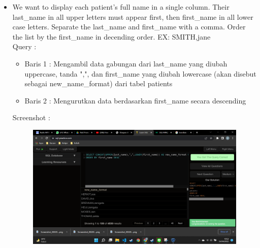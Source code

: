 \documentclass[]{article}
\begin{document}
\begin{itemize}
        \item We want to display each patient's full name in a single column. Their last\_name in all upper letters must appear first, then first\_name in all lower case letters. Separate the last\_name and first\_name with a comma. Order the list by the first\_name in decending order. EX: SMITH,jane
        \\Query :
        
        \begin{itemize}
            \item Baris 1 : Mengambil data gabungan dari last\_name yang diubah uppercase, tanda ",", dan first\_name yang diubah lowercase (akan disebut sebagai new\_name\_format) dari tabel patients
            \item Baris 2 : Mengurutkan data berdasarkan first\_name secara descending
        \end{itemize}
        \pagebreak
        Screenshot :
        \begin{figure}[h]
            \includegraphics[scale=0.3]{./Screenshot/Medium-13.png}
            \centering
        \end{figure}


\end{itemize}
\end{document}
